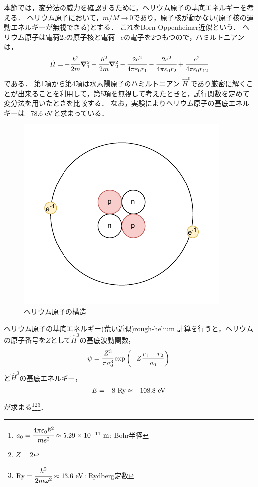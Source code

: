 \documentclass{report}
\begin{document}
  本節では，変分法の威力を確認するために，ヘリウム原子の基底エネルギーを考える．
  ヘリウム原子において，$m/M \to 0$であり，原子核が動かない(原子核の運動エネルギーが無視できる)とする．
  これをBorn-Oppenheimer近似という．
  ヘリウム原子は電荷$2e$の原子核と電荷$-e$の電子を2つもつので，ハミルトニアンは，
  \begin{align}
    \hat{H} = -\cfrac{\hbar^2}{2m}\grad_{1}^{2} -\cfrac{\hbar^2}{2m}\grad_{2}^{2} - \cfrac{2e^2}{4\pi \varepsilon_0 r_1} - \cfrac{2e^2}{4\pi \varepsilon_0 r_2} + \cfrac{e^2}{4\pi \varepsilon_0 r_{12}}
  \end{align}
  である．
  第1項から第4項は水素陽原子のハミルトニアン $\hat{H}^0$であり厳密に解くことが出来ることを利用して，第5項を無視して考えたときと，試行関数を定めて変分法を用いたときを比較する．
  なお，実験によりヘリウム原子の基底エネルギーは$-78.6\ \mathrm{eV}$と求まっている．
  \begin{figure}[htbp]
    \centering
    \includegraphics[width=0.5\columnwidth]{fig/helium.pdf}
    \caption{ヘリウム原子の構造}\label{helium-atom}
  \end{figure}
  \begin{myex}{ヘリウム原子の基底エネルギー(荒い近似)}{rough-helium}
    計算を行うと，ヘリウムの原子番号を$Z$として$\hat{H}^0$の基底波動関数，
    \begin{align}
      \psi = \cfrac{Z^3}{\pi a_0^3}\exp\qty(-Z\frac{r_1 + r_2}{a_0})\label{helium}
    \end{align}
    と$\hat{H}^0$の基底エネルギー，
    \begin{align}
      E = -8\ \mathrm{Ry}\approx -108.8\ \mathrm{eV}\label{helium-rough-min}
    \end{align}
    が求まる\footnote{
      $a_0 = \cfrac{4\pi\epsilon_0\hbar^2}{me^2} \approx 5.29\times 10^{-11}\ \r{m}$: Bohr半径
    }\footnote{
      $Z = 2$
    }\footnote{
      $\mathrm{Ry} = \cfrac{\hbar^2}{2m\omega^2} \approx 13.6 \ \mathrm{eV}$: Rydberg定数
    }．
  \end{myex}
\end{document}
